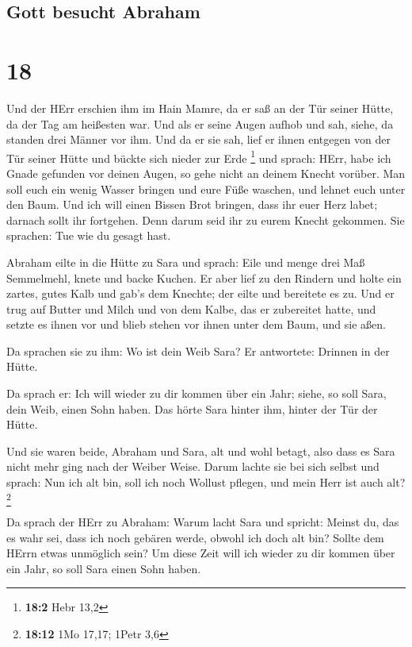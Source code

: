 \hypertarget{gott-besucht-abraham}{%
\subsection{Gott besucht Abraham}\label{gott-besucht-abraham}}

\hypertarget{section-17}{%
\section{18}\label{section-17}}

 Und der HErr erschien ihm im Hain Mamre, da er saß an der
Tür seiner Hütte, da der Tag am heißesten war.  Und als er
seine Augen aufhob und sah, siehe, da standen drei Männer vor ihm. Und
da er sie sah, lief er ihnen entgegen von der Tür seiner Hütte und
bückte sich nieder zur Erde \footnote{\textbf{18:2} Hebr 13,2}
 und sprach: HErr, habe ich Gnade gefunden vor deinen
Augen, so gehe nicht an deinem Knecht vorüber.  Man soll
euch ein wenig Wasser bringen und eure Füße waschen, und lehnet euch
unter den Baum.  Und ich will einen Bissen Brot bringen,
dass ihr euer Herz labet; darnach sollt ihr fortgehen. Denn darum seid
ihr zu eurem Knecht gekommen. Sie sprachen: Tue wie du gesagt hast.

 Abraham eilte in die Hütte zu Sara und sprach: Eile und
menge drei Maß Semmelmehl, knete und backe Kuchen.  Er
aber lief zu den Rindern und holte ein zartes, gutes Kalb und gab's dem
Knechte; der eilte und bereitete es zu.  Und er trug auf
Butter und Milch und von dem Kalbe, das er zubereitet hatte, und setzte
es ihnen vor und blieb stehen vor ihnen unter dem Baum, und sie aßen.

 Da sprachen sie zu ihm: Wo ist dein Weib Sara? Er
antwortete: Drinnen in der Hütte.

 Da sprach er: Ich will wieder zu dir kommen über ein
Jahr; siehe, so soll Sara, dein Weib, einen Sohn haben. Das hörte Sara
hinter ihm, hinter der Tür der Hütte.

 Und sie waren beide, Abraham und Sara, alt und wohl
betagt, also dass es Sara nicht mehr ging nach der Weiber Weise.
 Darum lachte sie bei sich selbst und sprach: Nun ich alt
bin, soll ich noch Wollust pflegen, und mein Herr ist auch alt?
\footnote{\textbf{18:12} 1Mo 17,17; 1Petr 3,6}

 Da sprach der HErr zu Abraham: Warum lacht Sara und
spricht: Meinst du, das es wahr sei, dass ich noch gebären werde, obwohl
ich doch alt bin?  Sollte dem HErrn etwas unmöglich sein?
Um diese Zeit will ich wieder zu dir kommen über ein Jahr, so soll Sara
einen Sohn haben.

